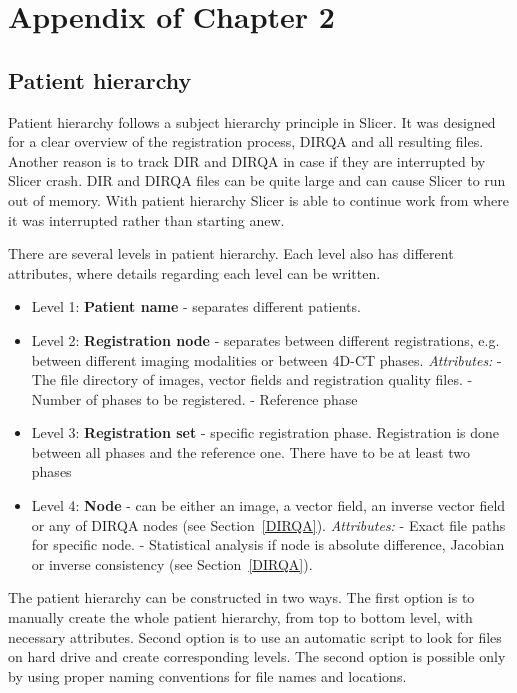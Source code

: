 \documentclass[type=dr, dr=rernat, accentcolor=tud7b,colorbacktitle, bigchapter, openright, twoside, 12pt ]{tudthesis}
\begin{document}
\chapter{Appendix of Chapter 2}
\label{AppendixA}
\minitoc

\section{Patient hierarchy}
\label{PatHierarchy}

Patient hierarchy follows a subject hierarchy principle in Slicer. It was designed for a clear overview of the registration process, DIRQA and all resulting files. Another reason is to track DIR
and DIRQA in case if they are interrupted by Slicer crash. DIR and DIRQA files can be quite large and can cause Slicer to run out of memory. With patient hierarchy Slicer is able to continue work
from where it was interrupted rather than starting anew.

There are several levels in patient hierarchy. Each level also has different attributes, where details regarding each level can be written.

\begin{itemize}
	\item Level 1: \textbf{Patient name} - separates different patients.
	\item Level 2: \textbf{Registration node} - separates between different registrations, e.g. between different imaging modalities or between 4D-CT phases. 
	\subitem \textit{Attributes:}
	\subitem - The file directory of images, vector fields and registration quality files.
	\subitem - Number of phases to be registered.
	\subitem - Reference phase
	\item Level 3: \textbf{Registration set} - specific registration phase. Registration is done between all phases and the reference one. There have to be at least two phases
	\item Level 4: \textbf{Node} - can be either an image, a vector field, an inverse vector field or any of DIRQA nodes (see Section~\ref{DIRQA}).
	\subitem \textit{Attributes:}
	\subitem - Exact file paths for specific node.
	\subitem - Statistical analysis if node is absolute difference, Jacobian or inverse consistency (see Section~\ref{DIRQA}).
\end{itemize}

The patient hierarchy can be constructed in two ways. The first option is to manually create the whole patient hierarchy, from top to bottom level, with necessary attributes. Second option is to use an automatic script to look 
for files on hard drive and create corresponding levels. The second option is possible only by using proper naming conventions for file names and locations.
\end{document}
